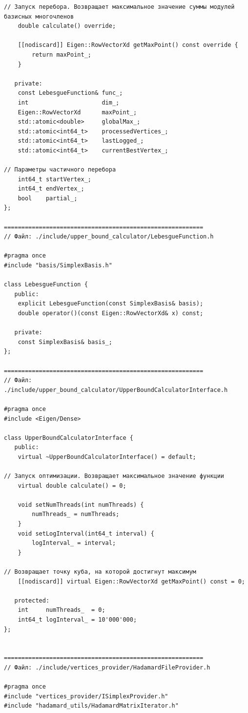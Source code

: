 \documentclass[a4paper,12pt]{article}
\begin{document}
\begin{lstlisting}
// Запуск перебора. Возвращает максимальное значение суммы модулей базисных многочленов
    double calculate() override;

    [[nodiscard]] Eigen::RowVectorXd getMaxPoint() const override {
        return maxPoint_;
    }

   private:
    const LebesgueFunction& func_;
    int                     dim_;
    Eigen::RowVectorXd      maxPoint_;
    std::atomic<double>     globalMax_;
    std::atomic<int64_t>    processedVertices_;
    std::atomic<int64_t>    lastLogged_;
    std::atomic<int64_t>    currentBestVertex_;

// Параметры частичного перебора
    int64_t startVertex_;
    int64_t endVertex_;
    bool    partial_;
};

=========================================================
// Файл: ./include/upper_bound_calculator/LebesgueFunction.h

#pragma once
#include "basis/SimplexBasis.h"

class LebesgueFunction {
   public:
    explicit LebesgueFunction(const SimplexBasis& basis);
    double operator()(const Eigen::RowVectorXd& x) const;

   private:
    const SimplexBasis& basis_;
};

=========================================================
// Файл: ./include/upper_bound_calculator/UpperBoundCalculatorInterface.h

#pragma once
#include <Eigen/Dense>

class UpperBoundCalculatorInterface {
   public:
    virtual ~UpperBoundCalculatorInterface() = default;

// Запуск оптимизации. Возвращает максимальное значение функции
    virtual double calculate() = 0;

    void setNumThreads(int numThreads) {
        numThreads_ = numThreads;
    }
    void setLogInterval(int64_t interval) {
        logInterval_ = interval;
    }

// Возвращает точку куба, на которой достигнут максимум
    [[nodiscard]] virtual Eigen::RowVectorXd getMaxPoint() const = 0;

   protected:
    int     numThreads_  = 0;
    int64_t logInterval_ = 10'000'000;
};


=========================================================
// Файл: ./include/vertices_provider/HadamardFileProvider.h

#pragma once
#include "vertices_provider/ISimplexProvider.h"
#include "hadamard_utils/HadamardMatrixIterator.h"


\end{lstlisting}
\end{document}
